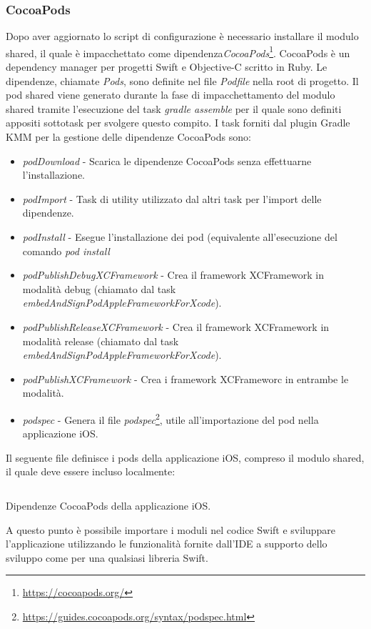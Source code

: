 \subsubsection{CocoaPods}
Dopo aver aggiornato lo script di configurazione è necessario installare il modulo shared, il quale è impacchettato come dipendenza\textit{CocoaPods}\footnote{\url{https://cocoapods.org/}}. CocoaPods è un dependency manager per progetti Swift e Objective-C scritto in Ruby. Le dipendenze, chiamate \textit{Pods}, sono definite nel file \textit{Podfile} nella root di progetto. Il pod shared viene generato durante la fase di impacchettamento del modulo shared tramite l'esecuzione del task \textit{gradle assemble} per il quale sono definiti appositi sottotask per svolgere questo compito. I task forniti dal plugin Gradle KMM per la gestione delle dipendenze CocoaPods sono:
\begin{itemize}
    \item \textit{podDownload} - Scarica le dipendenze CocoaPods senza effettuarne l'installazione.
    \item \textit{podImport} - Task di utility utilizzato dal altri task per l'import delle dipendenze.
    \item \textit{podInstall} - Esegue l'installazione dei pod (equivalente all'esecuzione del comando \textit{pod install}
    \item \textit{podPublishDebugXCFramework} - Crea il framework XCFramework in modalità debug (chiamato dal task \textit{embedAndSignPodAppleFrameworkForXcode}).
    \item \textit{podPublishReleaseXCFramework} - Crea il framework XCFramework in modalità release (chiamato dal task \textit{embedAndSignPodAppleFrameworkForXcode}).
    \item \textit{podPublishXCFramework} - Crea i framework XCFrameworc in entrambe le modalità.
    \item \textit{podspec} - Genera il file \textit{podspec}\footnote{\url{https://guides.cocoapods.org/syntax/podspec.html}}, utile all'importazione del pod nella applicazione iOS.
\end{itemize}

Il seguente file definisce i pods della applicazione iOS, compreso il modulo shared, il quale deve essere incluso localmente:

\begin{listing}[H]
\inputminted{bash}{code/5-podfile}
\caption{Dipendenze CocoaPods della applicazione iOS.}
\end{listing}
A questo punto è possibile importare i moduli nel codice Swift e sviluppare l'applicazione utilizzando le funzionalità fornite dall'IDE a supporto dello sviluppo come per una qualsiasi libreria Swift.


